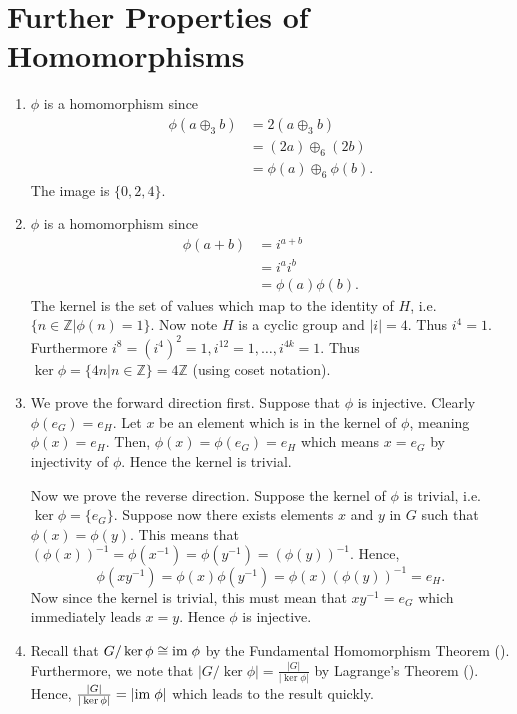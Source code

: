 \section{Further Properties of Homomorphisms}
\begin{enumerate}
    \item $\phi$ is a homomorphism since
    \begin{align*}
        \phi(a \oplus_3 b) &= 2(a\oplus_3 b)\\
        &= (2a) \oplus_6 (2b)\\
        &= \phi(a) \oplus_6 \phi(b).
    \end{align*}
    The image is $\{0, 2, 4\}$.

    \item $\phi$ is a homomorphism since
    \begin{align*}
        \phi(a+b) &= i^{a+b}\\
        &=i^ai^b\\
        &=\phi(a)\phi(b).
    \end{align*}
    The kernel is the set of values which map to the identity of $H$, i.e. $\{n \in \mathbb{Z} \vert \phi(n) = 1\}$. Now note $H$ is a cyclic group and $|i| = 4$. Thus $i^4 = 1$. Furthermore $i^8 = (i^4)^2 = 1, i^{12} = 1, \dots, i^{4k} = 1$. Thus $\ker\phi = \{4n \vert n \in \mathbb{Z}\} = 4\mathbb{Z}$ (using coset notation).

    \item We prove the forward direction first. Suppose that $\phi$ is injective. Clearly $\phi(e_G) = e_H$. Let $x$ be an element which is in the kernel of $\phi$, meaning $\phi(x) = e_H$. Then, $\phi(x) = \phi(e_G) = e_H$ which means $x = e_G$ by injectivity of $\phi$. Hence the kernel is trivial.

    Now we prove the reverse direction. Suppose the kernel of $\phi$ is trivial, i.e. $\ker \phi = \{e_G\}$. Suppose now there exists elements $x$ and $y$ in $G$ such that $\phi(x) = \phi(y)$. This means that $(\phi(x))^{-1} = \phi(x^{-1}) = \phi(y^{-1}) = (\phi(y))^{-1}$. Hence,
    \[
        \phi(xy^{-1})
        = \phi(x)\phi(y^{-1})
        = \phi(x)\left(\phi(y)\right)^{-1}
        = e_H.
    \]
    Now since the kernel is trivial, this must mean that $xy^{-1} = e_G$ which immediately leads $x=y$. Hence $\phi$ is injective.

    \item Recall that $G / \ker \phi \cong \mathrm{im}\; \phi$ by the Fundamental Homomorphism Theorem (). Furthermore, we note that $|G / \ker \phi| = \frac{|G|}{|\ker\phi|}$ by Lagrange's Theorem (). Hence, $\frac{|G|}{|\ker\phi|} = |\mathrm{im}\;\phi|$ which leads to the result quickly.


\end{enumerate}
